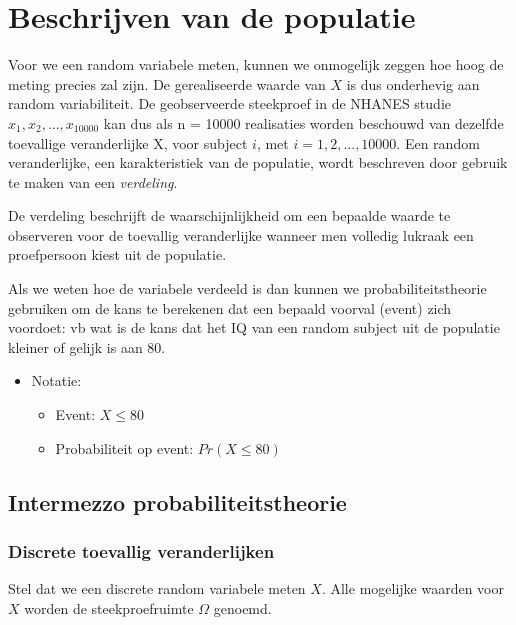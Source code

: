 \documentclass[
  12pt,dutch]{book}
\providecommand{\tightlist}{%
  \setlength{\itemsep}{0pt}\setlength{\parskip}{0pt}}
\theoremstyle{definition}
\theoremstyle{definition}
\theoremstyle{definition}
\theoremstyle{definition}
\theoremstyle{remark}
\begin{document}
\section{Beschrijven van de populatie}\label{beschrijven-van-de-populatie}

Voor we een random variabele meten, kunnen we onmogelijk zeggen hoe hoog de meting precies zal zijn.
De gerealiseerde waarde van \(X\) is dus onderhevig aan random variabiliteit.
De geobserveerde steekproef in de NHANES studie \(x_1, x_2, . . . , x_{10000}\) kan dus als n = 10000 realisaties worden beschouwd van dezelfde toevallige veranderlijke X, voor subject \(i\), met \(i = 1,2,...,10000\).
Een random veranderlijke, een karakteristiek van de populatie, wordt beschreven door gebruik te maken van een \emph{verdeling}.

De verdeling beschrijft de waarschijnlijkheid om een bepaalde waarde te observeren voor de toevallig veranderlijke wanneer men volledig lukraak een proefpersoon kiest uit de populatie.

Als we weten hoe de variabele verdeeld is dan kunnen we probabiliteitstheorie gebruiken om de kans te berekenen dat een bepaald voorval (event) zich voordoet: vb wat is de kans dat het IQ van een random subject uit de populatie kleiner of gelijk is aan 80.

\begin{itemize}
\item
  Notatie:

  \begin{itemize}
  \tightlist
  \item
    Event: \(X \leq 80\)
  \item
    Probabiliteit op event: \(Pr(X \leq 80)\)
  \end{itemize}
\end{itemize}

\subsection{Intermezzo probabiliteitstheorie}\label{intermezzo-probabiliteitstheorie}

\subsubsection{Discrete toevallig veranderlijken}\label{discrete-toevallig-veranderlijken}

Stel dat we een discrete random variabele meten \(X\). Alle mogelijke waarden voor \(X\) worden de steekproefruimte \(\Omega\) genoemd.
\end{document}
